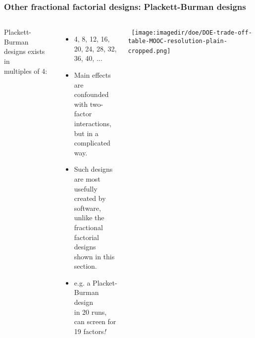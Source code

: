 \begin{frame}\frametitle{Other fractional factorial designs: Plackett-Burman designs}
 	\begin{columns}[T]
 		
			
			Plackett-Burman designs exists in \\
			multiples of 4:
			
				\begin{itemize}
					\item	4, 8, 12, 16, 20, 24, 28, 32, \\
							36, 40, $\ldots$
					
					\item	Main effects are confounded \\
							with two-factor interactions,\\
							but in a complicated way.
							
					\item	Such designs are most usefully \\
							created by software, unlike the\\
							fractional factorial designs \\
							shown in this section.
							
					\item	e.g. a Placket-Burman design\\
							in 20 runs, can screen for\\
							19 factors\emph{!}
							
				\end{itemize}
			\hbox{\hspace{-5.5em}
				\texttt{[image: \\imagedir/doe/DOE-trade-off-table-MOOC-resolution-plain-cropped.png]}
			}
					
 	\end{columns}
	 
	 
	
\end{frame}

